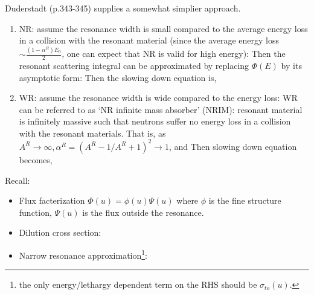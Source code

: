 \documentclass{school-22.211-notes}
\begin{document}
Duderstadt (p.343-345) supplies a somewhat simplier approach. 
\begin{enumerate}
\item NR: assume the resonance width is small compared to the average energy loss in a collision with the resonant material (since the average energy loss $\sim \frac{(1-\alpha^R)E_0}{2}$, one can expect that NR is valid for high energy): 
  Then the resonant scattering integral can be approximated by replacing $\Phi(E)$ by its asymptotic form: 
  Then the slowing down equation is, 

\item WR: assume the resonance width is wide compared to the energy loss: 
  WR can be referred to as `NR infinite mass absorber' (NRIM): resonant material is infinitely massive such that neutrons suffer no energy loss in a collision with the resonant materials. That is, as $A^R \to \infty, \alpha^R = (A^R - 1/A^R + 1)^2 \to 1$, and 
  Then slowing down equation becomes, 

\end{enumerate}





\clearpage
{}
Recall:
\begin{itemize}
\item Flux facterization $\Phi(u) = \phi(u) \Psi(u)$ where $\phi$ is the fine structure function, $\Psi(u)$ is the flux outside the resonance. 
\item Dilution cross section: 
\item Narrow resonance approximation\footnote{the only energy/lethargy dependent term on the RHS should be $\sigma_{to}(u)$.}:
\end{itemize}
\end{document}
